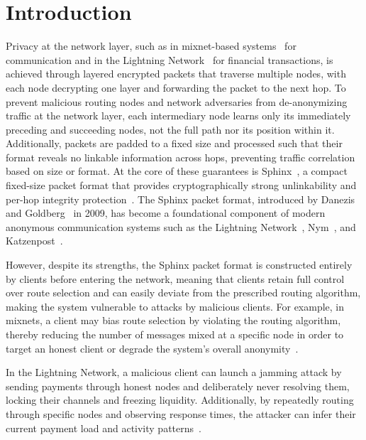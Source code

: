 \section{Introduction}

Privacy at the network layer, such as in mixnet-based systems~\cite{piotrowska2017loopix, van2015vuvuzela, kwon2020xrd, lazar2018karaoke, cottrell1995mixmaster, chaum2016cmix, chaum-mix, danezis2003mixminion} for communication and in the Lightning Network~\cite{poon2016bitcoin} for financial transactions, is achieved through layered encrypted packets that traverse multiple nodes, with each node decrypting one layer and forwarding the packet to the next hop. To prevent malicious routing nodes and network adversaries from de-anonymizing traffic at the network layer, each intermediary node learns only its immediately preceding and succeeding nodes, not the full path nor its position within it. Additionally, packets are padded to a fixed size and processed such that their format reveals no linkable information across hops, preventing traffic correlation based on size or format.
At the core of these guarantees is Sphinx~\cite{sphinx}, a compact fixed-size packet format that provides cryptographically strong unlinkability and per-hop integrity protection~\cite{sphinx}. The Sphinx packet format, introduced by Danezis and Goldberg~\cite{sphinx} in 2009, has become a foundational component of modern anonymous communication systems such as the Lightning Network~\cite{poon2016bitcoin}, Nym~\cite{nym}, and Katzenpost~\cite{infeld2025echomix}.

However, despite its strengths, the Sphinx packet format is constructed entirely by clients before entering the network, meaning that clients retain full control over route selection and can easily deviate from the prescribed routing algorithm, making the system vulnerable to attacks by malicious clients. 
For example, in mixnets, a client may bias route selection by violating the routing algorithm, thereby reducing the number of messages mixed at a specific node in order to target an honest client or degrade the system's overall anonymity~\cite{benguirat2022mixnet}.

In the Lightning Network, a malicious client can launch a jamming attack by sending payments through honest nodes and deliberately never resolving them, locking their channels and freezing liquidity. Additionally, by repeatedly routing through specific nodes and observing response times, the attacker can infer their current payment load and activity patterns~\cite{Rohrer2019paymentchannels, kappos2021empirical}.

